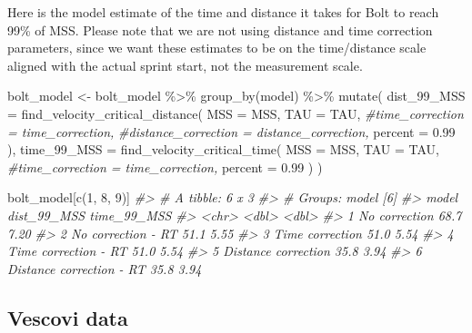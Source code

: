 \documentclass[fleqn,10pt,lineno]{wlpeerj} %
\newenvironment{Shaded}{\begin{snugshade}}{\end{snugshade}}
\newcommand{\AttributeTok}[1]{\textcolor[rgb]{0.77,0.63,0.00}{#1}}
\newcommand{\CommentTok}[1]{\textcolor[rgb]{0.56,0.35,0.01}{\textit{#1}}}
\newcommand{\DecValTok}[1]{\textcolor[rgb]{0.00,0.00,0.81}{#1}}
\newcommand{\FloatTok}[1]{\textcolor[rgb]{0.00,0.00,0.81}{#1}}
\newcommand{\FunctionTok}[1]{\textcolor[rgb]{0.00,0.00,0.00}{#1}}
\newcommand{\NormalTok}[1]{#1}
\newcommand{\OtherTok}[1]{\textcolor[rgb]{0.56,0.35,0.01}{#1}}
\newcommand{\SpecialCharTok}[1]{\textcolor[rgb]{0.00,0.00,0.00}{#1}}
\begin{document}
Here is the model estimate of the time and distance it takes for Bolt to reach 99\% of MSS. Please note that we are not using distance and time correction parameters, since we want these estimates to be on the time/distance scale aligned with the actual sprint start, not the measurement scale.

\begin{Shaded}
\begin{Highlighting}[]
\NormalTok{bolt\_model }\OtherTok{\textless{}{-}}\NormalTok{ bolt\_model }\SpecialCharTok{\%\textgreater{}\%}
  \FunctionTok{group\_by}\NormalTok{(model) }\SpecialCharTok{\%\textgreater{}\%}
  \FunctionTok{mutate}\NormalTok{(}
    \AttributeTok{dist\_99\_MSS =} \FunctionTok{find\_velocity\_critical\_distance}\NormalTok{(}
      \AttributeTok{MSS =}\NormalTok{ MSS, }\AttributeTok{TAU =}\NormalTok{ TAU, }
      \CommentTok{\#time\_correction = time\_correction, }
      \CommentTok{\#distance\_correction = distance\_correction,}
      \AttributeTok{percent =} \FloatTok{0.99}
\NormalTok{    ),}
   \AttributeTok{time\_99\_MSS =} \FunctionTok{find\_velocity\_critical\_time}\NormalTok{(}
      \AttributeTok{MSS =}\NormalTok{ MSS, }\AttributeTok{TAU =}\NormalTok{ TAU, }
      \CommentTok{\#time\_correction = time\_correction, }
      \AttributeTok{percent =} \FloatTok{0.99}
\NormalTok{    )}
\NormalTok{  )}

\NormalTok{bolt\_model[}\FunctionTok{c}\NormalTok{(}\DecValTok{1}\NormalTok{, }\DecValTok{8}\NormalTok{, }\DecValTok{9}\NormalTok{)]}
\CommentTok{\#\textgreater{} \# A tibble: 6 x 3}
\CommentTok{\#\textgreater{} \# Groups:   model [6]}
\CommentTok{\#\textgreater{}   model                    dist\_99\_MSS time\_99\_MSS}
\CommentTok{\#\textgreater{}   \textless{}chr\textgreater{}                          \textless{}dbl\textgreater{}       \textless{}dbl\textgreater{}}
\CommentTok{\#\textgreater{} 1 No correction                   68.7        7.20}
\CommentTok{\#\textgreater{} 2 No correction {-} RT              51.1        5.55}
\CommentTok{\#\textgreater{} 3 Time correction                 51.0        5.54}
\CommentTok{\#\textgreater{} 4 Time correction {-} RT            51.0        5.54}
\CommentTok{\#\textgreater{} 5 Distance correction             35.8        3.94}
\CommentTok{\#\textgreater{} 6 Distance correction {-} RT        35.8        3.94}
\end{Highlighting}
\end{Shaded}

\hypertarget{vescovi-data}{%
\subsection{Vescovi data}\label{vescovi-data}}
\end{document}
